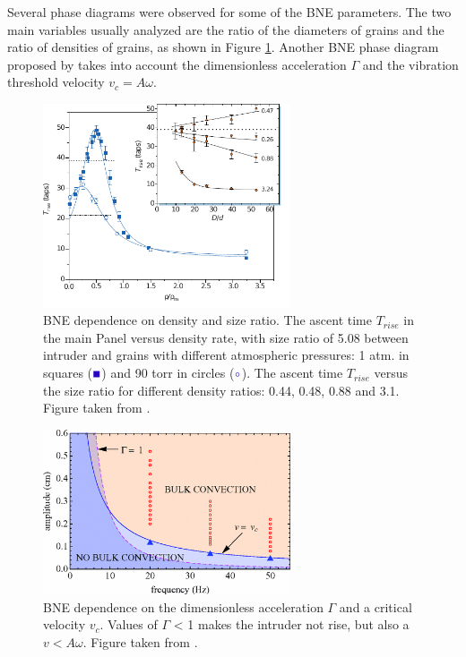     Several phase diagrams were observed for some of the BNE parameters. The two main variables usually analyzed are the ratio of the diameters of grains and the ratio of densities of grains, as shown in Figure \ref{fig:BNE_mobius}. Another BNE phase diagram proposed by \cite{Scaling_behavior_in_convection-driven_Brazil-nut_effect} takes into account the dimensionless acceleration $\Gamma$ and the vibration threshold velocity $v_c = A \omega$.

\begin{figure}[H]
    \centering
    \includegraphics[width=0.65\textwidth]{04-figuras/BNE_Mobius.pdf}
    \caption[Phase diagram of BNE: density ratio and size ratio.]{BNE dependence on density and size ratio. The ascent time $T_{rise}$ in the main Panel versus density rate, with size ratio of 5.08 between intruder and grains with different atmospheric pressures: 1 atm. in squares ($\textcolor{blue}{\blacksquare}$) and 90 torr in circles ($\textcolor{blue}{\circ}$). The ascent time $T_{rise}$ versus the size ratio for different density ratios: 0.44, 0.48, 0.88 and 3.1. Figure taken from \cite{Brazil-Nut_effect_Size_separation_of_granular_particles}.}
    \label{fig:BNE_mobius}
\end{figure}

\begin{figure}[H]
    \centering
    \includegraphics[width=0.65\textwidth]{04-figuras/BNE_Hejmady_PhaseSpace.png}
    \caption[Phase diagram of BNE: $\Gamma$ and $v_c$.]{BNE dependence on the dimensionless acceleration $\Gamma$ and a critical velocity $v_c$. Values of $\Gamma$ < 1 makes the intruder not rise, but also a $v < A \omega$. Figure taken from \cite{Scaling_behavior_in_convection-driven_Brazil-nut_effect}.}
    \label{fig:BNE_hejmady_convection}
\end{figure}

